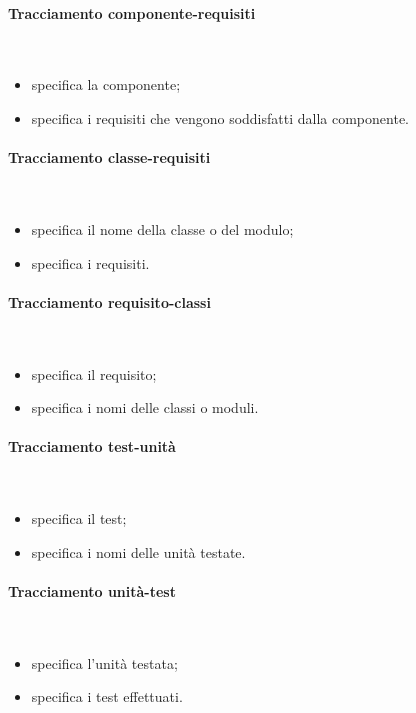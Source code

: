 \paragraph{Tracciamento componente-requisiti} \hfill \\

\begin{itemize}
\item {}specifica la componente;
\item {}specifica i requisiti che vengono soddisfatti dalla componente.
\end{itemize}

\paragraph{Tracciamento classe-requisiti} \hfill \\
\begin{itemize}
\item {}specifica il nome della classe o del modulo;
\item {}specifica i requisiti.
\end{itemize}

\paragraph{Tracciamento requisito-classi} \hfill \\
\begin{itemize}
\item {}specifica il requisito;
\item {}specifica i nomi delle classi o moduli.
\end{itemize}

\paragraph{Tracciamento test-unità} \hfill \\
\begin{itemize}
\item {}specifica il test;
\item {}specifica i nomi delle unità testate.
\end{itemize}
\paragraph{Tracciamento unità-test} \hfill \\
\begin{itemize}
\item {}specifica l'unità testata;
\item {}specifica i test effettuati.
\end{itemize}
